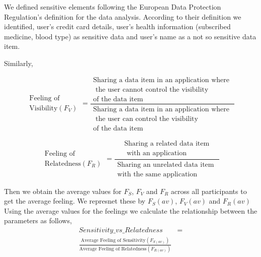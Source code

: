 \documentclass[conference]{IEEEtran}
\begin{document}
We defined sensitive elements following the European Data Protection Regulation's definition for the data analysis. According to their definition we identified, user's credit card details, user's health information (subscribed medicine, blood type) as sensitive data and user's name as a not so sensitive data item. 

Similarly, 

\[ \begin{aligned} \text{Feeling of } \\ \text{Visibility}(F_{V}) \end{aligned} =
\frac{\begin{aligned}
      \text{Sharing a data item in an application where } \\ \text{ the user cannot control the visibility} \\ \text{of the data item}
      \end{aligned}}%
 {\begin{aligned}
       \text{Sharing a data item in an application where } \\ \text{ the user can control the visibility} \\ \text{of the data item}
      \end{aligned}}
\]



\[ \begin{aligned} \text{Feeling of } \\ \text{Relatedness}(F_{R})\end{aligned} =
\frac{\begin{aligned}
      \text{Sharing a related data item} \\ \text{  with an application}
      \end{aligned}}%
 {\begin{aligned}
      \text{Sharing an unrelated data item }\\ \text{with the same application}
      \end{aligned}}
\]

Then we obtain the average values for $F_S$, $F_V$ and $F_R$ across all participants to get the average feeling. We represnet these by $F_S(av)$, $F_V(av)$ and $F_R(av)$ Using the average values for the feelings we calculate the relationship between the parameters as follows,
 \begin{equation} \label{eq1}
\begin{split}
Sensitivity\_vs\_Relatedness & = \\ \frac{\text{Average Feeling of Sensitivity}(F_{S(av)})}{\text{Average Feeling of Relatedness}(F_{R(av)})} 
\end{split}
\end{equation}
\end{document}
